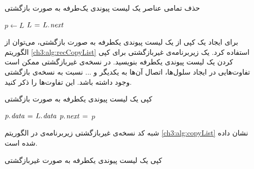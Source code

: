 \begin{algorithm}
\caption{حذف تمامی عناصر یک لیست پیوندی یک‌طرفه به صورت بازگشتی}\label{ch3:alg:modRecMkNull}
\begin{latin}
\begin{algorithmic}[1]
				\State \Return
		\Else
				\State	$p \gets L$
				\State	$L \mathrel{\hspace{1pt}=\hspace{1pt}} L.\hspace*{1pt}\mathit{next}$
				\State	{}			
				\State	{}
		\EndIf
\EndProcedure
\end{algorithmic}
\end{latin}
\end{algorithm}

 برای ایجاد یک کپی از یک لیست پیوندی یکطرفه به صورت بازگشتی، می‌توان از الگوریتم {\ref{ch3:alg:recCopyList}} استفاده کرد. یک زیربرنامه‌ی غیربازگشتی برای کپی کردن یک لیست پیوندی یکطرفه بنویسید. در نسخه‌ی غیربازگشتی ممکن است تفاوت‌هایی در ایجاد سلول‌ها، اتصال آن‌ها به یکدیگر و ... نسبت به نسخه‌ی بازگشتی وجود داشته باشد. این تفاوت‌ها را ذکر کنید.
\begin{algorithm}
\caption{کپی یک لیست پیوندی یکطرفه به صورت بازگشتی}\label{ch3:alg:recCopyList}
\begin{latin}
\begin{algorithmic}[1]
				\State \Return {}
		\Else
				\State	{}
				\State	$p.\hspace*{1pt}\mathit{data} \mathrel{\hspace{1pt}=\hspace{1pt}} L.\hspace*{1pt}\mathit{data}$
				\State	$p.\hspace*{1pt}\mathit{next} \mathrel{\hspace{1pt}=\hspace{1pt}} $ 			
				\State	\Return $p$
		\EndIf
\EndProcedure
\end{algorithmic}
\end{latin}
\end{algorithm}


شبه کد نسخه‌ی غیربازگشتی زیربرنامه‌ی {} در الگوریتم {\ref{ch3:alg:copyList}} نشان داده شده است.
\begin{algorithm}
\caption{کپی یک لیست پیوندی یکطرفه به صورت غیربازگشتی}\label{ch3:alg:copyList}
\begin{latin}
\end{latin}
\end{algorithm}

